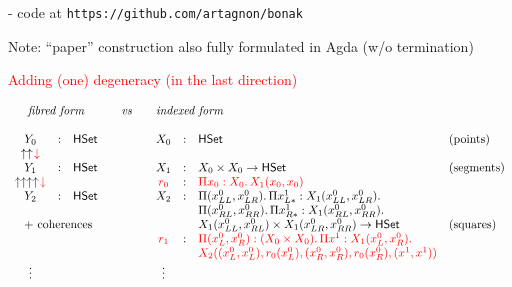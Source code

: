 \documentclass[12pt,landscape]{article}
\begin{document}
\begin{LARGE}
\begin{sf}
\noindent - code at \texttt{https://github.com/artagnon/bonak}
\bigskip
\bigskip

\noindent Note: ``paper'' construction also fully formulated in Agda (w/o termination)


\newpage

\begin{center}
\textcolor{red}{\huge Adding (one) degeneracy (in the last direction)}
\end{center}

\newcommand{\rouge}[1]{\textcolor{red}{#1}}
\newcommand{\bleu}[1]{\textcolor{blue}{#1}}

$$
\begin{array}{cllccllll}
\multicolumn{3}{c}{\mbox{\emph{fibred form}}} & \quad\mathit{vs}\quad & \multicolumn{3}{l}{\mbox{\emph{indexed form}}} \\
\\
Y_0 &:& \HSet{l} & & X_0 & : & \HSet{l} & \mbox{(points)}\\
\uparrow\uparrow\!\rouge{\downarrow} \\
Y_1 &:& \HSet{l} & & X_1 & : & X_0 \times X_0 \rightarrow \HSet{l} & \mbox{(segments)}\\
\uparrow\uparrow\uparrow\uparrow\!\rouge{\downarrow} &&&& \rouge{r_0} & : & \rouge{\Pi x_0:X_0.\,X_1(x_0,x_0)}\\
Y_2 &:& \HSet{l} & & X_2 & : & \Pi (x^0_{LL},x^0_{LR}).\, \Pi x^1_{L*}:X_1 (x^0_{LL},x^0_{LR}).\\
& & & & & & \Pi (x^0_{RL},x^0_{RR}).\, \Pi x^1_{R*}:X_1 (x^0_{RL},x^0_{RR}).\, \\
\multicolumn{3}{c}{\mbox{~+ coherences}} & & & & X_1 (x^0_{LL},x^0_{RL}) \times X_1 (x^0_{LR},x^0_{RR}) \rightarrow \HSet{l} \qquad & \mbox{(squares)}\\
&&&& \rouge{r_1} & : & \rouge{\Pi (x^0_{L},x^0_{R}):(X_0 \times X_0).\,\Pi x^1:X_1(x^0_L,x^0_R).}\,\\
& & & & & & \rouge{X_2((x^0_{L},x^0_{L}),r_0(x^0_{L}),(x^0_{R},x^0_{R}),r_0(x^0_{R}),(x^1,x^1))}\\
\vdots & & & & \vdots\\
\end{array}
$$


\bigskip



\end{sf}
\end{LARGE}
\end{document}
